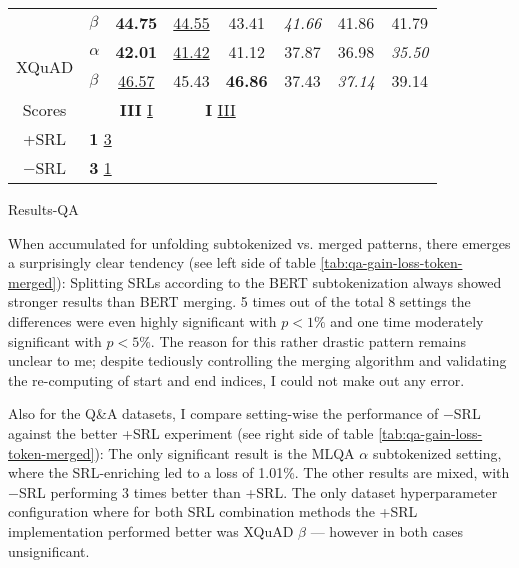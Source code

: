 {{\begin{tabular}{llccc|ccc}
    \multicolumn{1}{c}{}                       & $\beta$   & \multicolumn{1}{c|}{\textbf{44.75}}             & \multicolumn{1}{c}{\underline{44.55}} & \multicolumn{1}{c|}{43.41}             & \multicolumn{1}{c|}{\textit{41.66}} & \multicolumn{1}{c}{41.86}          & \multicolumn{1}{c}{41.79}          \\ \cline{3-8}
    \multicolumn{1}{c}{\multirow{2}{*}{XQuAD}} & $\alpha$  & \multicolumn{1}{c|}{\textbf{42.01}}             & \multicolumn{1}{c}{\underline{41.42}} & \multicolumn{1}{c|}{41.12}             & \multicolumn{1}{c|}{37.87}          & \multicolumn{1}{c}{36.98}          & \multicolumn{1}{c}{\textit{35.50}} \\
    \multicolumn{1}{c}{}                       & $\beta$   & \multicolumn{1}{c|}{\underline{46.57}}          & \multicolumn{1}{c}{45.43}             & \multicolumn{1}{c|}{\textbf{46.86}}    & \multicolumn{1}{c|}{37.43}          & \multicolumn{1}{c}{\textit{37.14}} & \multicolumn{1}{c}{39.14}          \\ \hline\hline
    \multicolumn{1}{c}{Scores}                 &           & \multicolumn{1}{c|}{\textbf{III} \underline{I}} & \multicolumn{2}{c|}{\textbf{I} \underline{III}}                                & \multicolumn{1}{c|}{}               & \multicolumn{2}{c}{}                                                    \\ \cline{1-2}
    \multicolumn{1}{c}{+SRL}                   & \multicolumn{3}{l}{\textbf{1} \underline{3}} \\
    \multicolumn{1}{c}{$-$SRL}                 & \multicolumn{3}{l}{\textbf{3} \underline{1}}

    \end{tabular}
  }
}{Results-QA}

When accumulated for unfolding subtokenized vs. merged patterns, there emerges a surprisingly
clear tendency (see left side of table \ref{tab:qa-gain-loss-token-merged}): Splitting SRLs according to
the BERT subtokenization always showed stronger results than BERT merging. 5 times out of the
total 8 settings the differences were even highly significant with $p < 1\%$ and one time
moderately significant with $p < 5\%$. The reason for this rather {\color{red} drastic pattern
remains unclear to me}; despite tediously controlling the merging algorithm and validating the
re-computing of start and end indices, I could not make out any error.

Also for the Q\&A datasets, I compare setting-wise the performance of $-$SRL against the better +SRL experiment
(see right side of table \ref{tab:qa-gain-loss-token-merged}): The only significant result is the MLQA $\alpha$
subtokenized setting, where the SRL-enriching led to a loss of 1.01\%. The other results are mixed, with $-$SRL
performing 3 times better than +SRL.
The only dataset hyperparameter configuration where for both SRL combination methods the +SRL implementation
performed better was XQuAD $\beta$ --- however in both cases unsignificant.


